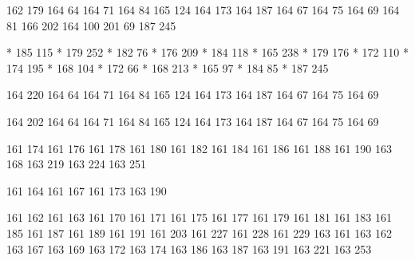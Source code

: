   162 179
  164  64
  164  71
  164  84
  165 124
  164 173
  164 187
  164  67
  164  75
  164  69
  164  81
  166 202
  164 100
  201  69
  187 245

* 185 115
* 179 252
* 182  76
* 176 209
* 184 118
* 165 238
* 179 176
* 172 110
* 174 195
* 168 104
* 172  66
* 168 213
* 165  97
* 184  85
* 187 245

  164 220
  164  64
  164  71
  164  84
  165 124
  164 173
  164 187
  164  67
  164  75
  164  69

  164 202
  164  64
  164  71
  164  84
  165 124
  164 173
  164 187
  164  67
  164  75
  164  69

\stopencoding

\startencoding[gbk]

 161 174
 161 176
 161 178
 161 180
 161 182
 161 184
 161 186
 161 188
 161 190
 163 168
 163 219
 163 224
 163 251

 161 164
 161 167
 161 173
 163 190

 161 162
 161 163
 161 170
 161 171
 161 175
 161 177
 161 179
 161 181
 161 183
 161 185
 161 187
 161 189
 161 191
 161 203
 161 227
 161 228
 161 229
 163 161
 163 162
 163 167
 163 169
 163 172
 163 174
 163 186
 163 187
 163 191
 163 221
 163 253

